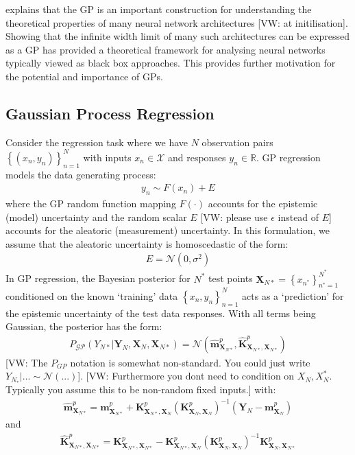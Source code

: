 \documentclass{article}
\newcommand{\vw}[1]{{\color{green} [VW: #1]}}
\newcommand{\GP}{\operatorname{\mathcal{GP}}}
\numberwithin{equation}{section}
\begin{document}
\cite{novak2019neural} explains that the GP is an important construction for understanding the theoretical properties of many neural network architectures \vw{at initilisation}. Showing that the infinite width limit of many such architectures can be expressed as a GP has provided a theoretical framework for analysing neural networks typically viewed as black box approaches. This provides further motivation for the potential and importance of GPs.

\subsection{Gaussian Process Regression}
Consider the regression task where we have $N$ observation pairs $\left\{(x_n, y_n)\right\}_{n=1}^{N}$ with inputs $x_n \in \mathcal{X}$ and responses $y_n \in \mathbb{R}$. GP regression models the data generating process:
\begin{align}
    y_n \sim F(x_n) + E
\end{align}
where the GP random function mapping $F(\cdot)$ accounts for the epistemic (model) uncertainty and the random scalar $E$ \vw{please use $\epsilon$ instead of $E$} accounts for the aleatoric (measurement) uncertainty. In this formulation, we assume that the aleatoric uncertainty is homoscedastic of the form:
\begin{align}
    E = \mathcal{N} \left(0, \sigma^2\right)
\end{align}
In GP regression, the Bayesian posterior for $N^*$ test points $\textbf{X}_{N*} = \left\{x_{n^*}\right\}_{n^*=1}^{N^*}$ conditioned on the known `training' data $\left\{x_n, y_n \right\}_{n=1}^N$  acts as a `prediction' for the epistemic uncertainty of the test data responses. With all terms being Gaussian, the posterior has the form:
\begin{align}
    P_{\GP}\left(Y_{N*} | \mathbf{Y}_{N},  \mathbf{X}_{N},  \mathbf{X}_{N*}\right)  =  \mathcal{N}\left(\hat{\mathbf{m}}^p_{\mathbf{X}_{N*}}, \hat{\mathbf{K}}^p_{\mathbf{X}_{N*}, \mathbf{X}_{N*}}\right)
\end{align}
\vw{The $P_{GP}$ notation is somewhat non-standard. You could just write $Y_{N_*} | ... \sim \mathcal{N}(...)$}. \vw{Furthermore you dont need to condition on $X_N, X_N^*$. Typically you assume this to be non-random fixed inputs.}
with:
\begin{align}
    \hat{\mathbf{m}}^p_{\mathbf{X}_{N*}} = \mathbf{m}^p_{\mathbf{X}_{N*}} + \mathbf{K}^p_{\mathbf{X}_{N*}, \mathbf{X}_N} \left(\mathbf{K}^p_{\mathbf{X}_N, \mathbf{X}_N}\right)^{-1} \left( \mathbf{Y}_N - \mathbf{m}^p_{\mathbf{X}_N}\right)
\end{align}
and
\begin{align}
    \hat{\mathbf{K}}^p_{\mathbf{X}_{N*}, \mathbf{X}_{N*}} = \mathbf{K}^p_{\mathbf{X}_{N*}, \mathbf{X}_{N*}} - \mathbf{K}^p_{\mathbf{X}_{N*}, \mathbf{X}_N}\left(\mathbf{K}^p_{\mathbf{X}_N, \mathbf{X}_N}\right)^{-1}\mathbf{K}^p_{\mathbf{X}_N, \mathbf{X}_{N*}}
\end{align}
\end{document}
